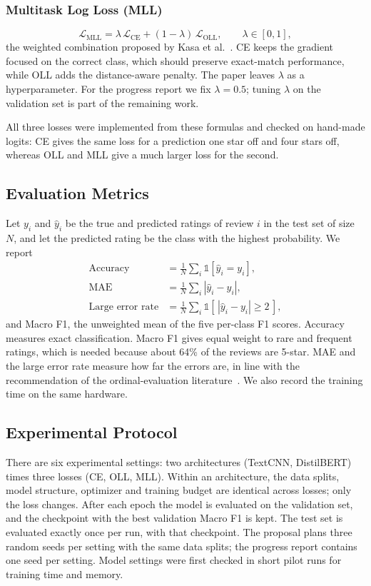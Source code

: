 \subsubsection{Multitask Log Loss (MLL)}
\begin{equation}
\mathcal{L}_{\mathrm{MLL}} = \lambda\,\mathcal{L}_{\mathrm{CE}} + (1-\lambda)\,\mathcal{L}_{\mathrm{OLL}},\qquad \lambda\in[0,1],
\end{equation}
the weighted combination proposed by Kasa et al.~\cite{kasa2024}. CE keeps the gradient focused on the correct class, which should preserve exact-match performance, while OLL adds the distance-aware penalty. The paper leaves $\lambda$ as a hyperparameter. For the progress report we fix $\lambda=0.5$; tuning $\lambda$ on the validation set is part of the remaining work.

All three losses were implemented from these formulas and checked on hand-made logits: CE gives the same loss for a prediction one star off and four stars off, whereas OLL and MLL give a much larger loss for the second.

\subsection{Evaluation Metrics}
\label{sec:metrics}
Let $y_i$ and $\hat{y}_i$ be the true and predicted ratings of review $i$ in the test set of size $N$, and let the predicted rating be the class with the highest probability. We report
\begin{align}
\text{Accuracy} &= \tfrac{1}{N}\textstyle\sum_i \mathbb{1}[\hat{y}_i=y_i],\\
\text{MAE} &= \tfrac{1}{N}\textstyle\sum_i |\hat{y}_i-y_i|,\\
\text{Large error rate} &= \tfrac{1}{N}\textstyle\sum_i \mathbb{1}[\,|\hat{y}_i-y_i|\ge 2\,],
\end{align}
and Macro F1, the unweighted mean of the five per-class F1 scores. Accuracy measures exact classification. Macro F1 gives equal weight to rare and frequent ratings, which is needed because about 64\% of the reviews are 5-star. MAE and the large error rate measure how far the errors are, in line with the recommendation of the ordinal-evaluation literature~\cite{gaudette2009,chen2021}. We also record the training time on the same hardware.

\subsection{Experimental Protocol}
\label{sec:protocol}
There are six experimental settings: two architectures (TextCNN, DistilBERT) times three losses (CE, OLL, MLL). Within an architecture, the data splits, model structure, optimizer and training budget are identical across losses; only the loss changes. After each epoch the model is evaluated on the validation set, and the checkpoint with the best validation Macro F1 is kept. The test set is evaluated exactly once per run, with that checkpoint. The proposal plans three random seeds per setting with the same data splits; the progress report contains one seed per setting. Model settings were first checked in short pilot runs for training time and memory.


